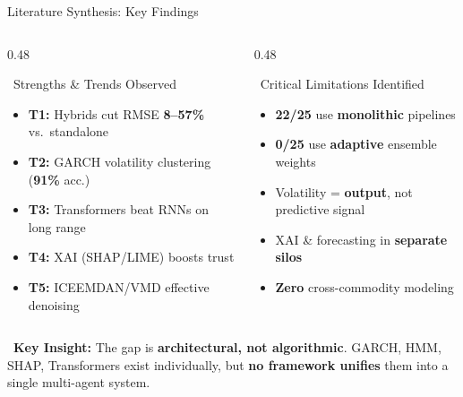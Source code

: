 \documentclass{beamer}
\begin{document}
\begin{frame}[label=lit_findings]{Literature Synthesis: Key Findings}

\begin{columns}[T]
\begin{column}{0.48\textwidth}
\begin{successcard}{~Strengths \& Trends Observed}
\footnotesize
\begin{itemize}\setlength\itemsep{2pt}
\item \textbf{T1:} Hybrids cut RMSE \textbf{8--57\%} vs.\ standalone
\item \textbf{T2:} GARCH volatility clustering (\textbf{91\%} acc.)
\item \textbf{T3:} Transformers beat RNNs on long range
\item \textbf{T4:} XAI (SHAP/LIME) boosts trust
\item \textbf{T5:} ICEEMDAN/VMD effective denoising
\end{itemize}
\end{successcard}
\end{column}
\begin{column}{0.48\textwidth}
\begin{alertcard}{~Critical Limitations Identified}
\footnotesize
\begin{itemize}\setlength\itemsep{2pt}
\item \textbf{22/25} use \textbf{monolithic} pipelines
\item \textbf{0/25} use \textbf{adaptive} ensemble weights
\item Volatility = \textbf{output}, not predictive signal
\item XAI \& forecasting in \textbf{separate silos}
\item \textbf{Zero} cross-commodity modeling
\end{itemize}
\end{alertcard}
\end{column}
\end{columns}

\vspace{0.1cm}

\begin{tcolorbox}[enhanced, colback=warmyellow!8, colframe=warmyellow!60, arc=5pt,
  boxrule=0.3pt, left=6pt, right=6pt, top=3pt, bottom=3pt,
  shadow={1pt}{-1pt}{0pt}{black!10}]
\centering\footnotesize
{}~\textbf{Key Insight:} The gap is \textbf{architectural, not algorithmic}. GARCH, HMM, SHAP, Transformers exist individually, but \textbf{no framework unifies} them into a single multi-agent system.
\end{tcolorbox}

\end{frame}
\end{document}
